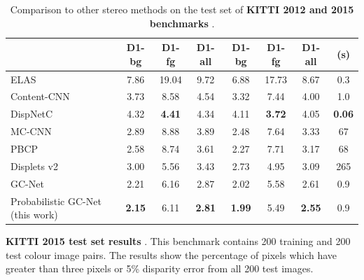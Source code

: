 \begin{table}[t]
\begin{subtable}[t]{\linewidth}
{\begin{tabular}{l|ccc|ccc|c}
                   & D1-bg   & D1-fg   & D1-all  & D1-bg   & D1-fg   & D1-all  & (s)     \\ \hline \hline
ELAS \citep{geiger2010efficient} 	& 7.86 & 19.04 & 9.72 & 6.88 & 17.73 & 8.67 & 0.3 \\
Content-CNN \citep{luo2016efficient} & 3.73 & 8.58  & 4.54 & 3.32 & 7.44  & 4.00 & 1.0 \\
DispNetC \citep{MIFDB16} 			& 4.32 & \textbf{4.41}  & 4.34 & 4.11 & \textbf{3.72}  & 4.05 & \textbf{0.06}\\
MC-CNN \citep{zbontar2016stereo}     & 2.89 & 8.88  & 3.89 & 2.48 & 7.64  & 3.33 & 67  \\
PBCP \citep{Seki2016BMVC} 			& 2.58 & 8.74  & 3.61 & 2.27 & 7.71  & 3.17 & 68  \\
Displets v2 \citep{guney2015displets}& 3.00 & 5.56  & 3.43 & 2.73 & 4.95  & 3.09 & 265 \\
GC-Net \citep{kendall2017end}		& 2.21 & 6.16  & 2.87 & 2.02 & 5.58  & 2.61 & 0.9 \\ \hline
Probabilistic GC-Net (this work)	& \textbf{2.15} & 6.11  & \textbf{2.81} & \textbf{1.99} & 5.49  & \textbf{2.55} & 0.9 \\ 
\end{tabular}}
	\caption[KITTI benchmark results.]{\textbf{KITTI 2015 test set results} \citep{Menze2015CVPR}. This benchmark contains 200 training and 200 test colour image pairs. The results show the percentage of pixels which have greater than three pixels or 5\% disparity error from all 200 test images.}
	\label{tbl:kitti2015_2}
\end{subtable}
	\caption[Comparison to other stereo methods on the KITTI test set.]{Comparison to other stereo methods on the test set of \textbf{KITTI 2012 and 2015 benchmarks} \citep{Geiger2012CVPR,Menze2015CVPR}.}
\end{table}

